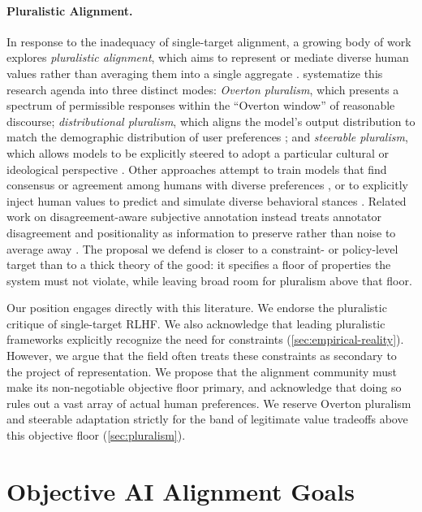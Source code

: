 \documentclass{article}
\theoremstyle{plain}
\theoremstyle{definition}
\theoremstyle{remark}
\begin{document}
\paragraph{Pluralistic Alignment.}
In response to the inadequacy of single-target alignment, a growing body of work explores \emph{pluralistic alignment}, which aims to represent or mediate diverse human values rather than averaging them into a single aggregate \citep{gabriel2020artificial, conitzer2024social, wan2023everyone, li2026pluriharms}. \citet{sorensen2024roadmap} systematize this research agenda into three distinct modes: \emph{Overton pluralism}, which presents a spectrum of permissible responses within the ``Overton window'' of reasonable discourse; \emph{distributional pluralism}, which aligns the model's output distribution to match the demographic distribution of user preferences \citep[e.g.,][]{pmlr-v202-santurkar23a}; and \emph{steerable pluralism}, which allows models to be explicitly steered to adopt a particular cultural or ideological perspective \citep{ghate2025evaluesteer}. Other approaches attempt to train models that find consensus or agreement among humans with diverse preferences \citep{bakker2022fine}, or to explicitly inject human values to predict and simulate diverse behavioral stances \citep{kang-etal-2023-values}. Related work on disagreement-aware subjective annotation instead treats annotator disagreement and positionality as information to preserve rather than noise to average away \citep{wan2025noise}.
 The proposal we defend is closer to a constraint- or policy-level target than to a thick theory of the good: it specifies a floor of properties the system must not violate, while leaving broad room for pluralism above that floor.

Our position engages directly with this literature. We endorse the pluralistic critique of single-target RLHF. We also acknowledge that leading pluralistic frameworks explicitly recognize the need for constraints (\cref{sec:empirical-reality}). However, we argue that the field often treats these constraints as secondary to the project of representation. We propose that the alignment community must make its non-negotiable objective floor primary, and acknowledge that doing so rules out a vast array of actual human preferences. We reserve Overton pluralism and steerable adaptation strictly for the band of legitimate value tradeoffs above this objective floor (\cref{sec:pluralism}).

\section{Objective AI Alignment Goals}
\label{sec:objective}
\end{document}
